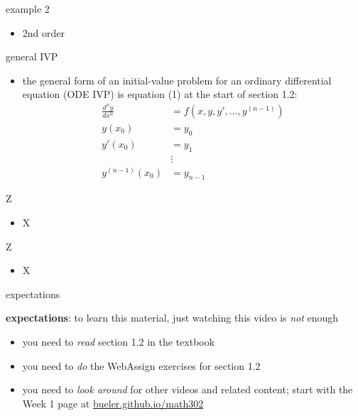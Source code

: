 \documentclass{beamer}
\begin{document}
\begin{frame}{example 2}

\begin{itemize}
\item 2nd order
\end{itemize}
\end{frame}

\begin{frame}{general IVP}

\begin{itemize}
\item the general form of an initial-value problem for an ordinary differential equation (ODE IVP) is equation (1) at the start of section 1.2:
\begin{align*}
\frac{d^n y}{dx^n} &= f(x,y,y',\dots,y^{(n-1)}) \\
y(x_0) &= y_0 \\
y'(x_0) &= y_1 \\
   &\vdots \\
y^{(n-1)}(x_0) &= y_{n-1}
\end{align*}
\end{itemize}
\end{frame}

\begin{frame}{Z}

\begin{itemize}
\item X
\end{itemize}
\end{frame}

\begin{frame}{Z}

\begin{itemize}
\item X
\end{itemize}
\end{frame}



\begin{frame}{expectations}

\textbf{expectations}:  to learn this material, just watching this video is \emph{not} enough
\begin{itemize}
\item you need to \emph{read} section 1.2 in the textbook
\item you need to \emph{do} the WebAssign exercises for section 1.2
\item you need to \emph{look around} for other videos and related content; start with the Week 1 page at \href{https://bueler.github.io/math302/}{bueler.github.io/math302}
\end{itemize}
\end{frame}
\end{document}

